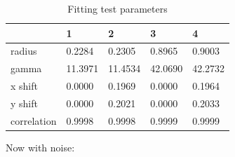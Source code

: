 \documentclass[12pt, a4paper, openany]{memoir}
\begin{document}
\begin{table}[h]
	\centering
	\caption{Fitting test parameters}
	\vspace{10px}
	\label{tb:fittingtest}
	\begin{tabular}{l|l|l|l|l}
		            & 1      & 2 & 3 & 4 \\
		\hline
		radius      & 0.2284   & 0.2305 & 0.8965 & 0.9003  \\
		gamma       & 11.3971 & 11.4534 & 42.0690 & 42.2732 \\
		x shift     & 0.0000  & 0.1969 & 0.0000 & 0.1964 \\
		y shift     & 0.0000  & 0.2021 & 0.0000 & 0.2033 \\ 
		correlation & 0.9998   & 0.9998 & 0.9999 & 0.9999 \\
	\end{tabular}
\end{table}

Now with noise:
\end{document}
